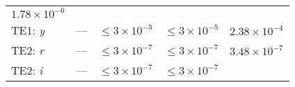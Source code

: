 \documentclass[DM,toc]{lsstdoc}
\begin{document}
\begin{longtable}[]{@{}lllll@{}}
\begin{minipage}[t]{0.22\columnwidth}
\(1.78\times 10^{-6}\)\strut
\end{minipage}\tabularnewline
\begin{minipage}[t]{0.13\columnwidth}\raggedright\strut
TE1: \emph{y}\strut
\end{minipage} & \begin{minipage}[t]{0.05\columnwidth}\raggedright\strut
---\strut
\end{minipage} & \begin{minipage}[t]{0.24\columnwidth}\raggedright\strut
\(\leq 3\times 10^{-5}\)\strut
\end{minipage} & \begin{minipage}[t]{0.21\columnwidth}\raggedright\strut
\(\leq 3\times 10^{-5}\)\strut
\end{minipage} & \begin{minipage}[t]{0.22\columnwidth}\raggedright\strut
\(2.38\times 10^{-4}\)\strut
\end{minipage}\tabularnewline
\begin{minipage}[t]{0.13\columnwidth}\raggedright\strut
TE2: \emph{r}\strut
\end{minipage} & \begin{minipage}[t]{0.05\columnwidth}\raggedright\strut
---\strut
\end{minipage} & \begin{minipage}[t]{0.24\columnwidth}\raggedright\strut
\(\leq 3\times 10^{-7}\)\strut
\end{minipage} & \begin{minipage}[t]{0.21\columnwidth}\raggedright\strut
\(\leq 3\times 10^{-7}\)\strut
\end{minipage} & \begin{minipage}[t]{0.22\columnwidth}\raggedright\strut
\(3.48\times 10^{-7}\)\strut
\end{minipage}\tabularnewline
\begin{minipage}[t]{0.13\columnwidth}\raggedright\strut
TE2: \emph{i}\strut
\end{minipage} & \begin{minipage}[t]{0.05\columnwidth}\raggedright\strut
---\strut
\end{minipage} & \begin{minipage}[t]{0.24\columnwidth}\raggedright\strut
\(\leq 3\times 10^{-7}\)\strut
\end{minipage} & \begin{minipage}[t]{0.21\columnwidth}\raggedright\strut
\(\leq 3\times 10^{-7}\)\strut
\end{minipage} & \begin{minipage}[t]{0.22\columnwidth}\raggedright\strut

\end{minipage}
\end{longtable}
\end{document}
